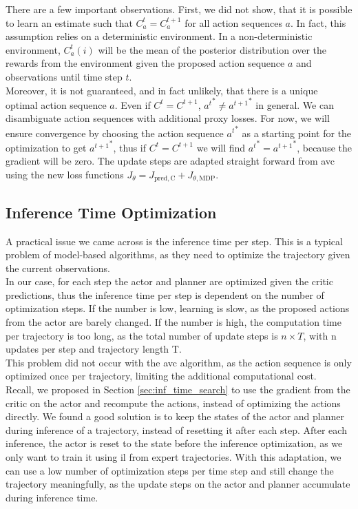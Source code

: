 There are a few important observations. First, we did not show, that it is possible to learn an estimate such that $C_a^t = C_a^{t+1}$ for all action sequences $a$. 
In fact, this assumption relies on a deterministic 
environment. In a non-deterministic environment, $C_a^t(i)$ will be the mean of the posterior distribution over the rewards from the environment given the proposed action sequence $a$ 
and observations until time step $t$. \\

Moreover, it is not guaranteed, and in fact unlikely, that there is a unique optimal action sequence $a$. Even if $C^t = C^{t+1}$, ${a^t}^* \neq {a^{t+1}}^*$ in general. We can 
disambiguate action sequences with additional proxy losses. 
For now, we will ensure convergence by choosing the action sequence ${a^t}^*$ as a starting point for the optimization to get ${a^{t+1}}^*$, thus if $C^t = C^{t+1}$ we will find 
${a^t}^* = {a^{t+1}}^*$, because the gradient will be zero. 
The update 
steps are adapted straight forward from \ac{avc} using the new loss functions $J_{\theta} = J_{\mathrm{pred, C}} + J_{\theta, \mathrm{MDP}}$. 

\subsection{Inference Time Optimization}
A practical issue we came across is the inference time per step. This is a typical problem of model-based algorithms, as they need to optimize the trajectory given 
the current observations.\\ 

In our case, for each step the actor and planner are optimized given the critic predictions, thus the inference time 
per step is dependent on the number of optimization steps. If the number is low, learning is slow, as the proposed actions from the actor are barely changed. 
If the number is high, the computation time per trajectory is too long, as the total number of update steps is $n \times T$, with n updates per step and trajectory length 
T.\\ 

This problem did not occur with the \ac{avc} algorithm, as the action sequence is only optimized 
once per trajectory, limiting the additional computational cost.\\

Recall, we proposed in Section \ref{sec:inf_time_search} to use the gradient from the critic on the actor and recompute the 
actions, instead of optimizing the actions directly. We found a good solution is to keep the states of the actor and planner during inference of a trajectory, 
instead of resetting it after each step. After each inference, the actor is reset to the state before the inference optimization, as we only want to 
train it using \ac{il} from expert trajectories. With this adaptation, we can use a low number of optimization steps per time step and still change the trajectory meaningfully, 
as the update steps on the actor and planner accumulate during inference time.
     
